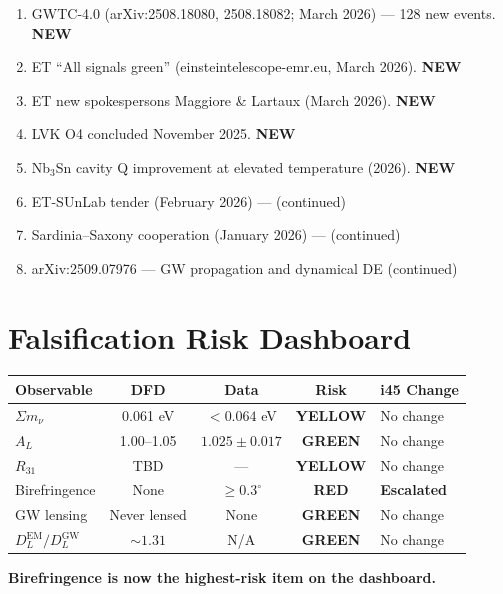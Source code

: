 \documentclass[11pt,a4paper]{article}
\newcommand{\GREEN}{\textcolor{dfdgreen}{\textbf{GREEN}}}
\newcommand{\YELLOW}{\textcolor{dfdyellow}{\textbf{YELLOW}}}
\newcommand{\RED}{\textcolor{dfdred}{\textbf{RED}}}
\newcommand{\NEW}{\textcolor{dfdblue}{\textbf{NEW}}}
\begin{document}
\begin{enumerate}
\item GWTC-4.0 (arXiv:2508.18080, 2508.18082; March 2026) --- 128 new events. \NEW
\item ET ``All signals green'' (einsteintelescope-emr.eu, March 2026). \NEW
\item ET new spokespersons Maggiore \& Lartaux (March 2026). \NEW
\item LVK O4 concluded November 2025. \NEW
\item Nb$_3$Sn cavity Q improvement at elevated temperature (2026). \NEW
\item ET-SUnLab tender (February 2026) --- (continued)
\item Sardinia--Saxony cooperation (January 2026) --- (continued)
\item arXiv:2509.07976 --- GW propagation and dynamical DE (continued)
\end{enumerate}


\part{Falsification Risk Dashboard}

\begin{center}
\begin{tabular}{lcccl}
\toprule
\textbf{Observable} & \textbf{DFD} & \textbf{Data} & \textbf{Risk} & \textbf{i45 Change} \\
\midrule
$\Sigma m_\nu$ & 0.061 eV & $< 0.064$ eV & \YELLOW & No change \\
$A_L$ & 1.00--1.05 & $1.025 \pm 0.017$ & \GREEN & No change \\
$R_{31}$ & TBD & --- & \YELLOW & No change \\
Birefringence & None & $\geq 0.3^\circ$ & \RED & \textbf{Escalated} \\
GW lensing & Never lensed & None & \GREEN & No change \\
$D_L^{\text{EM}}/D_L^{\text{GW}}$ & $\sim 1.31$ & N/A & \GREEN & No change \\
\bottomrule
\end{tabular}
\end{center}

\textbf{Birefringence is now the highest-risk item on the dashboard.}


\end{document}
